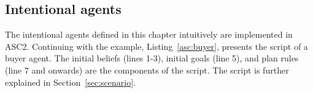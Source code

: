 \subsection{Intentional agents}
The intentional agents defined in this chapter intuitively are implemented in ASC2. 
Continuing with the example, Listing~\ref{asc:buyer}, presents the script of a buyer agent. The initial beliefs (lines 1-3), initial goals (line 5), and plan rules (line 7 and onwards) are the components of the script. The script is further explained in Section~\ref{sec:scenario}. 

